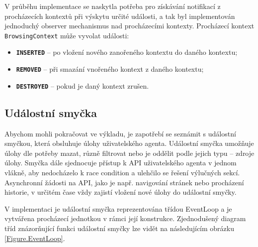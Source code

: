 V průběhu implementace se naskytla potřeba pro získávání notifikací z procházecích kontextů při výskytu určité události, a tak byl implementován jednoduchý observer mechanismus nad procházecími kontexty. Procházecí kontext \texttt{BrowsingContext} může vyvolat události:

\begin{itemize}
  \item \textbf{\texttt{INSERTED}} -- po vložení nového zanořeného kontextu do daného kontextu;
  \item \textbf{\texttt{REMOVED}} -- při smazání vnořeného kontext z daného kontextu;
  \item \textbf{\texttt{DESTROYED}} -- pokud je daný kontext zrušen. 
\end{itemize}

\subsection{Událostní smyčka}
\label{Chapter.Implementation.EventLoop}

Abychom mohli pokračovat ve výkladu, je zapotřebí se seznámit s událostní smyčkou, která obsluhuje úlohy uživatelského agenta. Událostní smyčka umožňuje úlohy dle potřeby mazat, různě filtrovat nebo je oddělit podle jejich typu -- zdroje úlohy. Smyčka dále sjednocuje přístup k API uživatelského agenta v jednom vlákně, aby nedocházelo k race condition a ulehčilo se řešení výlučných sekcí. Asynchronní žádosti na API, jako je např. navigování stránek nebo procházení historie, v určitém čase vždy zajistí vložení nové úlohy do událostní smyčky.

V implementaci je událostní smyčka reprezentována třídou EventLoop a je vytvářena procházecí jednotkou v rámci její konstrukce. Zjednodušený diagram tříd znázorňující funkci událostní smyčky lze vidět na následujícím obrázku \ref{Figure.EventLoop}. 

